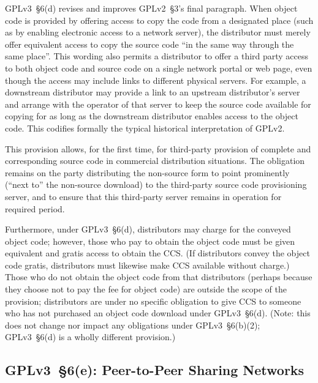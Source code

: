 
GPLv3~\S6(d) revises and improves GPLv2~\S3's final paragraph.  When object
code is provided by offering access to copy the code from a designated place
(such as by enabling electronic access to a network server), the distributor
must merely offer equivalent access to copy the source code ``in the same way
through the same place''.  This wording also permits a distributor to offer a
third party access to both object code and source code on a single network
portal or web page, even though the access may include links to different
physical servers.  For example, a downstream distributor may provide a link
to an upstream distributor's server and arrange with the operator of that
server to keep the source code available for copying for as long as the
downstream distributor enables access to the object code.  This codifies
formally the typical historical interpretation of GPLv2.


This provision allows, for the first time, for third-party provision of
complete and corresponding source code in commercial distribution
situations. The obligation remains on the party distributing the non-source
form to point prominently (``next to'' the non-source download) to the
third-party source code provisioning server, and to ensure that this
third-party server remains in operation for required period.


Furthermore, under GPLv3~\S6(d), distributors may charge for the conveyed
object code; however, those who pay to obtain the object code must be given
equivalent and gratis access to obtain the CCS.  (If distributors convey the
object code gratis, distributors must likewise make CCS available without
charge.)  Those who do not obtain the object code from that distributors
(perhaps because they choose not to pay the fee for object code) are outside
the scope of the provision; distributors are under no specific obligation to
give CCS to someone who has not purchased an object code download under
GPLv3~\S6(d).  (Note: this does not change nor impact any obligations under
GPLv3~\S6(b)(2); GPLv3~\S6(d) is a wholly different provision.)

\subsection{GPLv3~\S6(e): Peer-to-Peer Sharing Networks}

